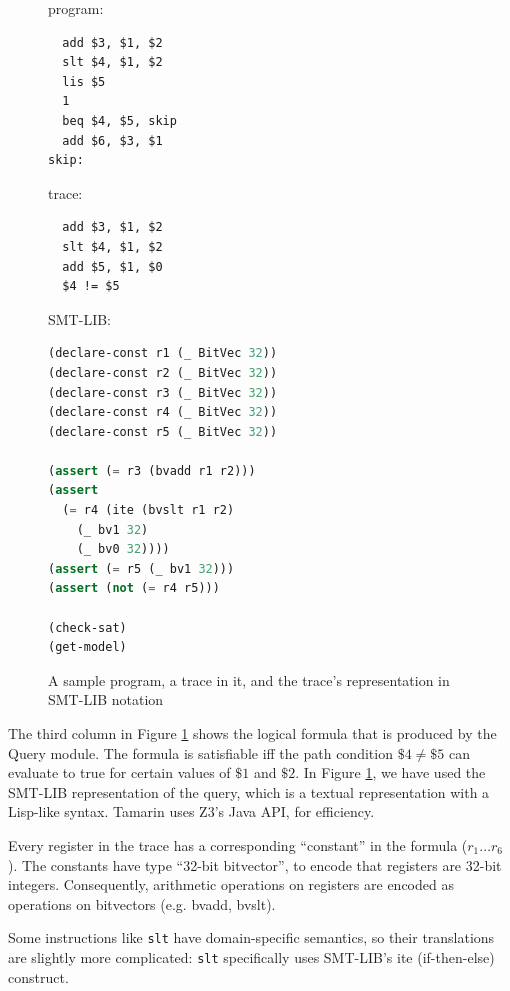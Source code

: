 \documentclass{llncs}
\begin{document}
\begin{figure}
\begin{multicols}{3}
program:
\begin{lstlisting}
  add $3, $1, $2
  slt $4, $1, $2
  lis $5
  1
  beq $4, $5, skip
  add $6, $3, $1
skip:
\end{lstlisting}

\vfill\null
\columnbreak

trace:
\begin{lstlisting}
  add $3, $1, $2
  slt $4, $1, $2
  add $5, $1, $0
  $4 != $5
\end{lstlisting}

\vfill\null
\columnbreak

SMT-LIB:
\begin{lstlisting}[language=Lisp]
(declare-const r1 (_ BitVec 32))
(declare-const r2 (_ BitVec 32))
(declare-const r3 (_ BitVec 32))
(declare-const r4 (_ BitVec 32))
(declare-const r5 (_ BitVec 32))

(assert (= r3 (bvadd r1 r2)))
(assert
  (= r4 (ite (bvslt r1 r2)
    (_ bv1 32)
    (_ bv0 32))))
(assert (= r5 (_ bv1 32)))
(assert (not (= r4 r5)))

(check-sat)
(get-model)
\end{lstlisting}
\end{multicols}
\caption{A sample program, a trace in it, and the trace's representation in SMT-LIB notation}
\label{smtlib}
\end{figure}

The third column in Figure \ref{smtlib} shows the logical formula that is produced by the \textsf{Query} module. The formula is satisfiable iff the path condition $\$4 \neq \$5$ can evaluate to true for certain values of $\$1$ and $\$2$. In Figure \ref{smtlib}, we have used the SMT-LIB \cite{barrett2010smt} representation of the query, which is a textual representation with a Lisp-like syntax. Tamarin uses Z3's Java API, for efficiency.

Every register in the trace has a corresponding ``constant'' in the formula ($r_1 \ldots r_6$). The constants have type ``32-bit bitvector'', to encode that registers are 32-bit integers. Consequently, arithmetic operations on registers are encoded as operations on bitvectors (e.g. \textsf{bvadd, bvslt}).

Some instructions like \lstinline{slt} have domain-specific semantics, so their translations are slightly more complicated: \lstinline{slt} specifically uses SMT-LIB's \textsf{ite} (if-then-else) construct.
\end{document}
